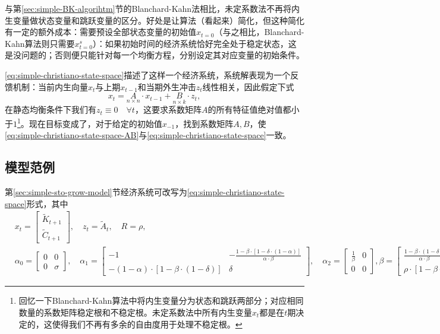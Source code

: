 与第\ref{sec:simple-BK-algorihtm}节的Blanchard-Kahn法相比，未定系数法不再将内生变量做状态变量和跳跃变量的区分。好处是让算法（看起来）简化，但这种简化有一定的额外成本：需要预设全部状态变量的初始值$x_{t=0}$（与之相比，Blanchard-Kahn算法则只需要$x_{t=0}^s$）：如果初始时间的经济系统恰好完全处于稳定状态，这是没问题的；否则便只能针对每一个均衡方程，分别设定其对应变量的初始条件。

\eqref{eq:simple-christiano-state-space}描述了这样一个经济系统，系统解表现为一个反馈机制：当前内生向量$x_t$与上期$x_{t-1}$和当期外生冲击$z_t$线性相关，因此假定下式
\begin{equation}
  \label{eq:simple-christiano-state-space-AB}
  x_t = \underset{n \times n}{A} \cdot x_{t-1} + \underset{n \times k}{B} \cdot z_{t},
\end{equation}
在静态均衡条件下我们有$z_{t} \equiv 0 \quad \forall t$，这要求系数矩阵$A$的所有特征值绝对值都小于$1$\footnote{回忆一下Blanchard-Kahn算法中将内生变量分为状态和跳跃两部分；对应相同数量的系数矩阵稳定根和不稳定根。未定系数法中所有内生变量$x_t$都是在$t$期决定的，这使得我们不再有多余的自由度用于处理不稳定根。}。现在目标变成了，对于给定的初始值$x_{-1}$，找到系数矩阵$A,B$，使  \eqref{eq:simple-christiano-state-space-AB}与\eqref{eq:simple-christiano-state-space}一致。

\subsection{模型范例}
第\ref{sec:simple-sto-grow-model}节经济系统可改写为\eqref{eq:simple-christiano-state-space}形式，其中
\begin{equation}
  \begin{split}
    &x_t = \begin{bmatrix}
    \tilde{K}_{t+1} \\ \tilde{C}_{t+1}
    \end{bmatrix}, \quad z_t = \tilde{A}_t, \quad R = \rho, \\
    &\alpha_0 = \begin{bmatrix}
    0 & 0 \\ 0 & \sigma
    \end{bmatrix},
    \quad \alpha_1 = \begin{bmatrix}
    -1 & -\frac{1-\beta \cdot \left[ 1-\delta \cdot (1-\alpha) \right]}{\alpha \cdot \beta} \\
    -(1-\alpha) \cdot \left[1-\beta \cdot (1-\delta)\right] & \delta
  \end{bmatrix}, \quad \alpha_2 = \begin{bmatrix}
  \frac{1}{\beta} & 0 \\
  0 & 0
\end{bmatrix}, \beta = \begin{bmatrix}
\frac{1-\beta \cdot (1-\delta)}{\alpha \cdot \beta} \\
\rho \cdot \left[ 1 - \beta \cdot (1-\delta) \right]
\end{bmatrix}.
  \end{split}
\end{equation}

